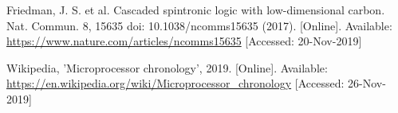 \documentclass[conference, 10pt]{IEEEtran}
\begin{document}
\begin{thebibliography}{00}
 Friedman, J. S. et al. Cascaded spintronic logic with low-dimensional carbon. Nat. Commun. 8, 15635 doi: 10.1038/ncomms15635 (2017). [Online]. Available: \url{https://www.nature.com/articles/ncomms15635} [Accessed: 20-Nov-2019]

 Wikipedia, 'Microprocessor chronology', 2019. [Online]. Available: \url{https://en.wikipedia.org/wiki/Microprocessor_chronology} [Accessed: 26-Nov-2019]




\end{thebibliography}
\end{document}
